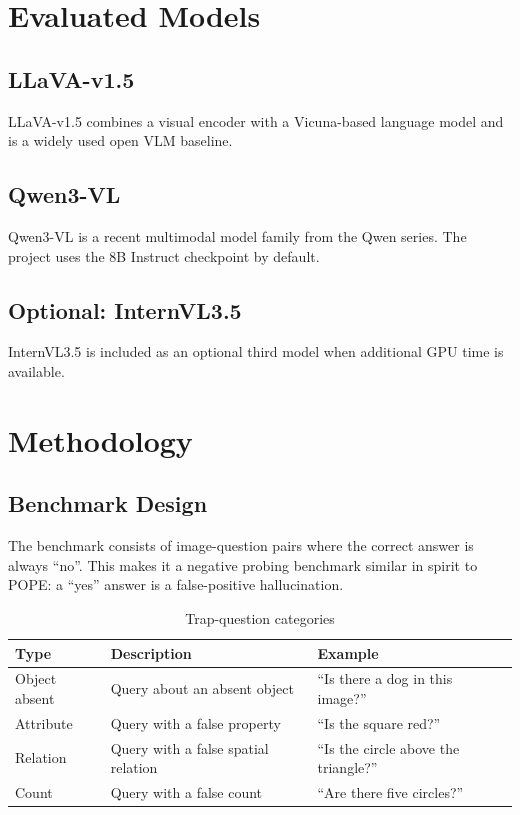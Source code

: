 \documentclass[11pt,a4paper]{article}
\begin{document}
\section{Evaluated Models}

\subsection{LLaVA-v1.5}

LLaVA-v1.5 combines a visual encoder with a Vicuna-based language model and is a widely used open VLM baseline.

\subsection{Qwen3-VL}

Qwen3-VL is a recent multimodal model family from the Qwen series. The project uses the 8B Instruct checkpoint by default.

\subsection{Optional: InternVL3.5}

InternVL3.5 is included as an optional third model when additional GPU time is available.

\section{Methodology}

\subsection{Benchmark Design}

The benchmark consists of image-question pairs where the correct answer is always \enquote{no}. This makes it a negative probing benchmark similar in spirit to POPE: a \enquote{yes} answer is a false-positive hallucination.

\begin{table}[h]
\centering
\caption{Trap-question categories}
\begin{tabular}{@{}lll@{}}
\toprule
\textbf{Type} & \textbf{Description} & \textbf{Example} \\
\midrule
Object absent & Query about an absent object & \enquote{Is there a dog in this image?} \\
Attribute & Query with a false property & \enquote{Is the square red?} \\
Relation & Query with a false spatial relation & \enquote{Is the circle above the triangle?} \\
Count & Query with a false count & \enquote{Are there five circles?} \\
\bottomrule
\end{tabular}
\end{table}
\end{document}
